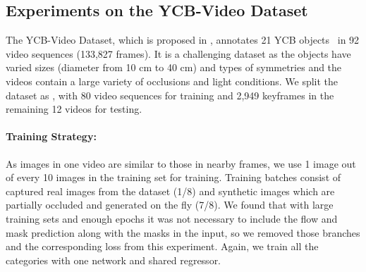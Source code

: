 \documentclass[twocolumn]{svjour3}
\begin{document}
% 
\subsection{Experiments on the YCB-Video Dataset}

The YCB-Video Dataset, which is proposed in \citep{xiang2017posecnn}, annotates 21 YCB objects~\citep{calli2015ycb} in 92 video sequences (133,827 frames). It is a challenging dataset as the objects have varied sizes (diameter from 10 cm to 40 cm) and types of symmetries and the videos contain a large variety of occlusions and light conditions. We split the dataset as \citep{xiang2017posecnn}, with 80 video sequences for training and 2,949 keyframes in the remaining 12 videos for testing.

\paragraph{Training Strategy:} As images in one video are similar to those in nearby frames, we use 1 image out of every 10 images in the training set for training. Training batches consist of captured real images from the dataset (1/8) and synthetic images which are partially occluded and generated on the fly (7/8). We found that with large training sets and enough epochs it was not necessary to include the flow and mask prediction along with the masks in the input, so we removed those branches and the corresponding loss from this experiment. Again, we train all the categories with one network and shared regressor.
\end{document}

